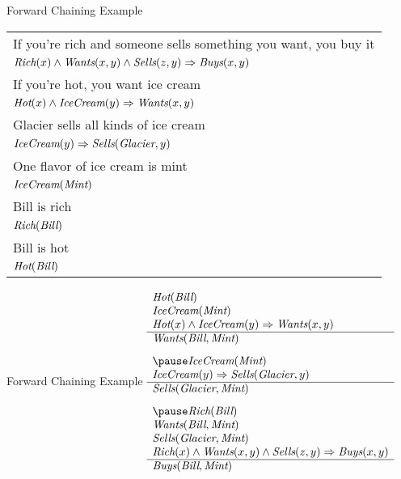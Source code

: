 \documentclass[12pt]{beamer}
\newcommand{\EM}[1]{\mbox{\em#1}}
\newcommand{\tab}{\hspace{1em}}
\newcommand{\limpl}{\Rightarrow}
\begin{document}
\begin{frame}{Forward Chaining Example}
	\begin{tabular}{p{4in}}
		If you're rich and someone sells something you want, you buy it \\
		\tab$\EM{Rich}(x) \land \EM{Wants}(x, y) \land \EM{Sells}(z, y) \limpl \EM{Buys}(x, y)$ \\
		If you're hot, you want ice cream \\
		\tab$\EM{Hot}(x) \land \EM{IceCream}(y) \limpl \EM{Wants}(x, y)$ \\
		Glacier sells all kinds of ice cream \\
		\tab$\EM{IceCream}(y) \limpl \EM{Sells}(\EM{Glacier}, y)$ \\
		One flavor of ice cream is mint \\
		\tab$\EM{IceCream}(\EM{Mint})$ \\
		Bill is rich \\
		\tab$\EM{Rich}(\EM{Bill})$ \\
		Bill is hot \\
		\tab$\EM{Hot}(\EM{Bill})$
	\end{tabular}
\end{frame}
\begin{frame}{Forward Chaining Example}
	$
	\begin{array}{l}
		\EM{Hot}(\EM{Bill}) \\
		\EM{IceCream}(\EM{Mint}) \\
		\EM{Hot}(x) \land \EM{IceCream}(y) \limpl \EM{Wants}(x, y) \\
		\hline
		\EM{Wants}(\EM{Bill}, \EM{Mint}) \\[.8em]
		\pause
		\EM{IceCream}(\EM{Mint}) \\
		\EM{IceCream}(y) \limpl \EM{Sells}(\EM{Glacier}, y) \\
		\hline
		\EM{Sells}(\EM{Glacier}, \EM{Mint}) \\[.8em]
		\pause
		\EM{Rich}(\EM{Bill}) \\
		\EM{Wants}(\EM{Bill}, \EM{Mint}) \\
		\EM{Sells}(\EM{Glacier}, \EM{Mint}) \\
		\EM{Rich}(x) \land \EM{Wants}(x, y) \land \EM{Sells}(z, y) \limpl \EM{Buys}(x, y) \\
		\hline
		\EM{Buys}(\EM{Bill}, \EM{Mint})
	\end{array}
	$
\end{frame}
\end{document}
